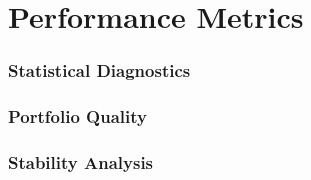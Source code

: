 
\part{Performance Metrics}
\label{signal_performance}

\section{Statistical Diagnostics}
\section{Portfolio Quality}
\section{Stability Analysis}